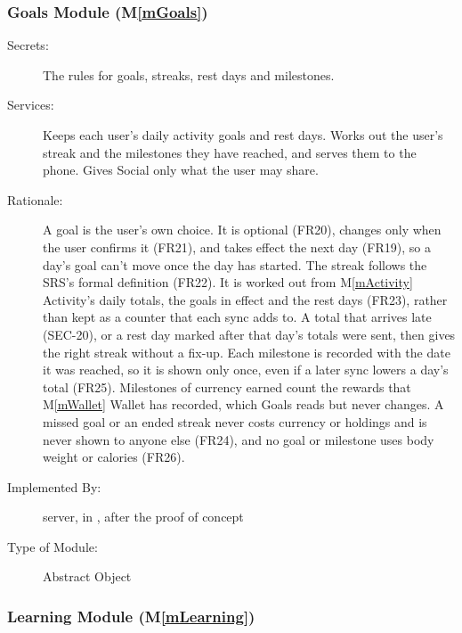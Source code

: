 \documentclass[12pt, titlepage]{article}
\newcommand{\mref}[1]{M\ref{#1}}
\begin{document}
\subsubsection{Goals Module (\mref{mGoals})}

\begin{description}
\item[Secrets:] The rules for goals, streaks, rest days and milestones.
\item[Services:] Keeps each user's daily activity goals and rest days. Works out the user's streak and the milestones they have reached, and serves them to the phone. Gives Social only what the user may share.
\item[Rationale:] A goal is the user's own choice. It is optional (FR20), changes only when the user confirms it (FR21), and takes effect the next day (FR19), so a day's goal can't move once the day has started. The streak follows the SRS's formal definition (FR22). It is worked out from \mref{mActivity} Activity's daily totals, the goals in effect and the rest days (FR23), rather than kept as a counter that each sync adds to. A total that arrives late (SEC-20), or a rest day marked after that day's totals were sent, then gives the right streak without a fix-up. Each milestone is recorded with the date it was reached, so it is shown only once, even if a later sync lowers a day's total (FR25). Milestones of currency earned count the rewards that \mref{mWallet} Wallet has recorded, which Goals reads but never changes. A missed goal or an ended streak never costs currency or holdings and is never shown to anyone else (FR24), and no goal or milestone uses body weight or calories (FR26).
\item[Implemented By:] \progname{} server, in , after the proof of concept
\item[Type of Module:] Abstract Object
\end{description}

\subsubsection{Learning Module (\mref{mLearning})}
\end{document}
